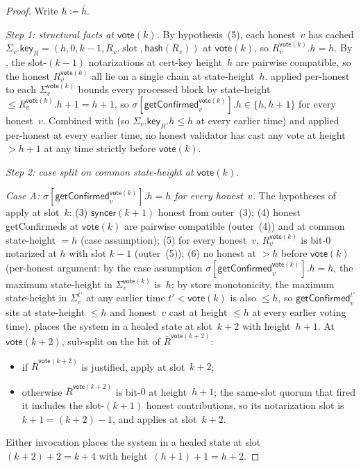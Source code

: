 \ifx\litemode\undefined\documentclass{article}\fi
\newcommand{\slot}[0]{\ensuremath{\operatorname{\mathrm{slot}}}}
\newcommand{\hash}{\mathsf{hash}}
\newcommand{\key}{\mathsf{key}}
\newcommand{\syncer}{\mathsf{syncer}}
\newcommand{\vote}{\mathsf{vote}}
\newcommand{\comm}[1]{\bar{#1}}
\newcommand{\getConfirmed}{\textsf{getConfirmed}\xspace}
\theoremstyle{plain}
\theoremstyle{definition}
\theoremstyle{remark}
\begin{document}
\begin{proof}
Write $h \coloneqq \comm{h}$.

\emph{Step 1: structural facts at $\vote(k)$.}
By hypothesis~(5), each honest~$v$ has cached $\Sigma_v.\key_R = (h, 0, k-1, R_v.\slot, \hash(R_v))$ at $\vote(k)$, so $R_v^{\vote(k)}.h = h$. By , the slot-$(k-1)$ notarizations at cert-key height~$h$ are pairwise compatible, so the honest $R_v^{\vote(k)}$ all lie on a single chain at state-height~$h$.  applied per-honest to each $\Sigma_v^{\vote(k)}$ bounds every processed block by state-height $\leq R_v^{\vote(k)}.h + 1 = h + 1$, so $\sigma[\getConfirmed_v^{\vote(k)}].h \in \{h, h+1\}$ for every honest~$v$. Combined with  (so $\Sigma_v.\key_R.h \leq h$ at every earlier time) and  applied per-honest at every earlier time, no honest validator has cast any vote at height $> h+1$ at any time strictly before $\vote(k)$.

\emph{Step 2: case split on common state-height at $\vote(k)$.}

\emph{Case A: $\sigma[\getConfirmed_v^{\vote(k)}].h = h$ for every honest~$v$.}
The hypotheses of  apply at slot~$k$: (3) $\syncer(k+1)$ honest from outer~(3); (4) honest \getConfirmed{}s at $\vote(k)$ are pairwise compatible (outer~(4)) and at common state-height $= h$ (case assumption); (5) for every honest~$v$, $R_v^{\vote(k)}$ is bit-$0$ notarized at $h$ with slot $k-1$ (outer~(5)); (6) no honest at $> h$ before $\vote(k)$ (per-honest argument: by the case assumption $\sigma[\getConfirmed_v^{\vote(k)}].h = h$, the maximum state-height in $\Sigma_v^{\vote(k)}$ is~$h$; by store monotonicity, the maximum state-height in $\Sigma_v^{t'}$ at any earlier time $t' < \vote(k)$ is also $\leq h$, so $\getConfirmed_v^{t'}$ sits at state-height $\leq h$ and honest~$v$ cast at height $\leq h$ at every earlier voting time).  places the system in a healed state at slot~$k+2$ with height~$h+1$.
At $\vote(k+2)$, sub-split on the bit of $\comm{R}^{\vote(k+2)}$:
\begin{itemize}
  \item if $\comm{R}^{\vote(k+2)}$ is justified, apply  at slot~$k+2$;
  \item otherwise $\comm{R}^{\vote(k+2)}$ is bit-$0$ at height~$h+1$; the same-slot quorum that fired it includes the slot-$(k+1)$ honest contributions, so its notarization slot is $k+1 = (k+2)-1$, and  applies at slot~$k+2$.
\end{itemize}
Either invocation places the system in a healed state at slot~$(k+2)+2 = k+4$ with height~$(h+1)+1 = h+2$.


\end{proof}
\end{document}
